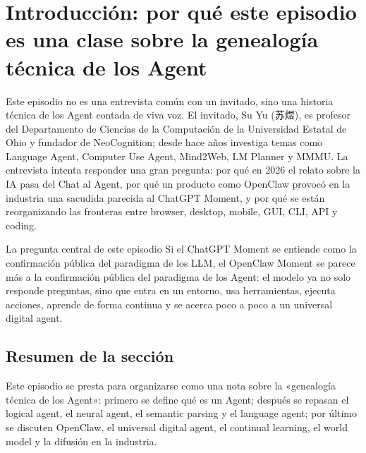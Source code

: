 \section{Introducción: por qué este episodio es una clase sobre la genealogía técnica de los Agent}

Este episodio no es una entrevista común con un invitado, sino una historia técnica de los Agent contada de viva voz. El invitado, Su Yu (苏煜), es profesor del Departamento de Ciencias de la Computación de la Universidad Estatal de Ohio y fundador de NeoCognition; desde hace años investiga temas como Language Agent, Computer Use Agent, Mind2Web, LM Planner y MMMU. La entrevista intenta responder una gran pregunta: por qué en 2026 el relato sobre la IA pasa del Chat al Agent, por qué un producto como OpenClaw provocó en la industria una sacudida parecida al ChatGPT Moment, y por qué se están reorganizando las fronteras entre browser, desktop, mobile, GUI, CLI, API y coding.

\begin{importantbox}{La pregunta central de este episodio}
Si el ChatGPT Moment se entiende como la confirmación pública del paradigma de los LLM, el OpenClaw Moment se parece más a la confirmación pública del paradigma de los Agent: el modelo ya no solo responde preguntas, sino que entra en un entorno, usa herramientas, ejecuta acciones, aprende de forma continua y se acerca poco a poco a un universal digital agent.
\end{importantbox}




\subsection{Resumen de la sección}

Este episodio se presta para organizarse como una nota sobre la «genealogía técnica de los Agent»: primero se define qué es un Agent; después se repasan el logical agent, el neural agent, el semantic parsing y el language agent; por último se discuten OpenClaw, el universal digital agent, el continual learning, el world model y la difusión en la industria.

